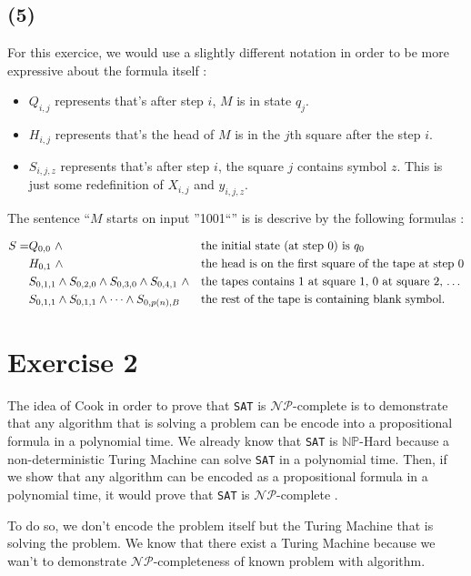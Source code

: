 \documentclass[a4paper,11pt]{report}
\newcommand*{\NPcp}{$\mathcal{NP}$-complete }
\newcommand*{\NPce}{$\mathcal{NP}$-completeness }
\begin{document}
\subsection*{(5)}

For this exercice, we would use a slightly different notation in order to be
more expressive about the formula itself :
\begin{itemize}
\item $Q_{i,j}$ represents that's after step $i$, $M$ is in state $q_j$.
\item $H_{i,j}$ represents that's the head of $M$ is in the $j$th square after
  the step $i$.
\item $S_{i,j,z}$ represents that's after step $i$, the square $j$ contains
  symbol $z$. This is just some redefinition of $X_{i,j}$ and $y_{i,j,z}$.
\end{itemize}

The sentence ``$M$ starts on input ''1001``'' is is descrive by the following
formulas :

\begin{align*}
  S 
  =& Q_{0,0}\ \wedge && \text{the initial state (at step $0$) is $q_0$} \\
  & H_{0,1}\ \wedge && \text{the head is on the first square of the tape at step $0$} \\
  & S_{0,1,1} \wedge S_{0,2,0} \wedge S_{0,3,0} \wedge S_{0,4,1}\ \wedge && \text{the tapes contains $1$ at square $1$, $0$ at square $2$, \dots} \\
  & S_{0,1,1} \wedge S_{0,1,1} \wedge \cdots \wedge S_{0,p(n),B} && \text{the rest of the tape is containing blank symbol}.
\end{align*}



\section*{Exercise 2}

The idea of Cook in order to prove that \texttt{SAT} is \NPcp is to demonstrate
that any algorithm that is solving a problem can be encode into a propositional
formula in a polynomial time. We already know that \texttt{SAT} is
$\mathbb{NP}$-Hard because a non-deterministic Turing Machine can solve
\texttt{SAT} in a polynomial time. Then, if we show that any algorithm can be
encoded as a propositional formula in a polynomial time, it would prove that
\texttt{SAT} is \NPcp.

To do so, we don't encode the problem itself but the Turing Machine that is
solving the problem. We know that there exist a Turing Machine because we wan't
to demonstrate \NPce of known problem with algorithm.
\end{document}
